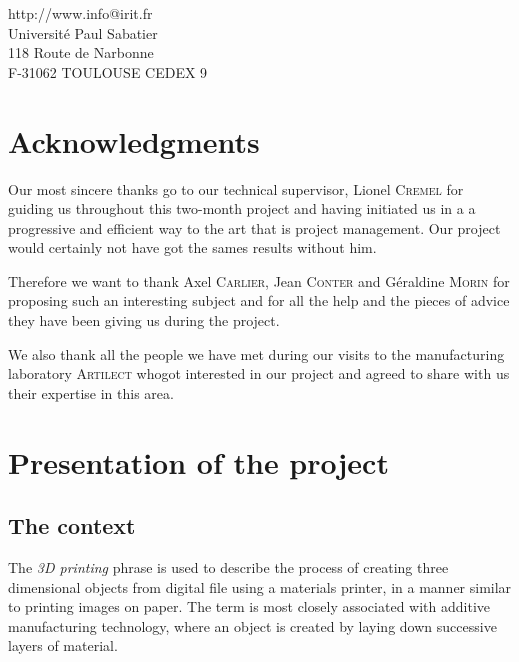 \documentclass{report}
\begin{document}
\begin{center}
http://www.info@irit.fr\\
Université Paul Sabatier \\
118 Route de Narbonne \\
F-31062 TOULOUSE CEDEX 9
\end{center}

\thispagestyle{empty}

\newpage

\chapter*{Acknowledgments}

	Our most sincere thanks go to our technical supervisor, Lionel \textsc{Cremel} for guiding us throughout this two-month project and having initiated us in a a progressive and efficient way to the art that is project management. Our project would certainly not have got the sames results without him.\\

\bigskip

	Therefore we want to thank Axel \textsc{Carlier}, Jean \textsc{Conter} and Géraldine \textsc{Morin} for proposing such an interesting subject and for all the help and the pieces of advice they have been giving us during the project.\\

\bigskip

	We also thank all the people we have met during our visits to the manufacturing laboratory \textsc{Artilect} whogot interested in our project and agreed to share with us their expertise in this area.

\tableofcontents

\chapter{Presentation of the project}

\section{The context}

	The \textit{3D printing} phrase is used to describe the process of creating three dimensional objects from digital file using a materials printer, in a manner similar to printing images on paper. The term is most closely associated with additive manufacturing technology, where an object is created by laying down successive layers of material.\\
\end{document}
